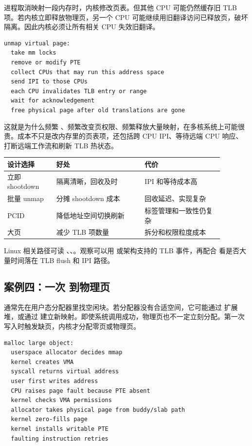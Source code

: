 进程取消映射一段内存时，内核修改页表。但其他 CPU 可能仍然缓存旧 TLB 项。若内核立即释放物理页，另一个 CPU 可能继续用旧翻译访问已释放页，破坏隔离。因此内核必须让所有相关 CPU 失效旧翻译。

\begin{lstlisting}
unmap virtual page:
  take mm locks
  remove or modify PTE
  collect CPUs that may run this address space
  send IPI to those CPUs
  each CPU invalidates TLB entry or range
  wait for acknowledgement
  free physical page after old translations are gone
\end{lstlisting}

这就是为什么频繁 、频繁改变页权限、频繁释放大量映射，在多核系统上可能很贵。成本不只是改内存里的页表项，还包括跨 CPU IPI、等待远端 CPU 响应、打断远端工作流和刷新 TLB 热状态。

\begin{longtable}{p{0.2\linewidth}p{0.36\linewidth}p{0.32\linewidth}}
\toprule
设计选择 & 好处 & 代价 \\
\midrule
立即 shootdown & 隔离清晰，回收及时 & IPI 和等待成本高 \\
批量 unmap & 分摊 shootdown 成本 & 回收延迟、实现复杂 \\
PCID & 降低地址空间切换刷新 & 标签管理和一致性仍复杂 \\
大页 & 减少 TLB 项数量 & 拆分和权限粒度成本 \\
\bottomrule
\end{longtable}

Linux 相关路径可读 、、。观察可以用  或架构支持的 TLB 事件，再配合  看是否大量时间落在 TLB flush 和 IPI 路径。

\subsection{案例四：一次  到物理页}

 通常先在用户态分配器里找空闲块。若分配器没有合适空间，它可能通过  扩展堆，或通过  建立新映射。即使系统调用成功，物理页也不一定立刻分配。第一次写入时触发缺页，内核才分配零页或物理页。

\begin{lstlisting}
malloc large object:
  userspace allocator decides mmap
  kernel creates VMA
  syscall returns virtual address
  user first writes address
  CPU raises page fault because PTE absent
  kernel checks VMA permissions
  allocator takes physical page from buddy/slab path
  kernel zero-fills page
  kernel installs writable PTE
  faulting instruction retries
\end{lstlisting}

